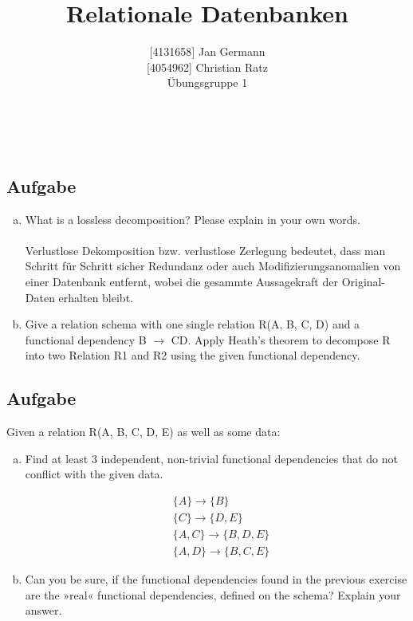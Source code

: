 \documentclass[11pt,a4paper,DIV=9]{scrartcl}
\author{{[}4131658{]} Jan Germann \\{[}4054962{]} Christian Ratz\\Übungsgruppe 1}
\title{Relationale Datenbanken}
\newcounter{temp}
\newcommand{\aufgabe}[1]{
  \setcounter{temp}{\value{subsection}}
  \setcounter{subsection}{#1}
  \addtocounter{subsection}{-1}
  \subsection{Aufgabe}
  \setcounter{subsection}{\value{temp}}
}
\renewcommand{\author}[1]{\renewcommand{\author}{#1}}
\renewcommand{\title}[1]{\renewcommand{\title}{#1}}
\newcommand{\makehomeworktitle}{
  \begin{minipage}[t]{6.5cm}
    \sf{\author}
  \end{minipage}
  \begin{minipage}[t]{6.5cm}
    \begin{flushright}
      \sf{\title\\\today}
    \end{flushright}
  \end{minipage}
  \\[0.2cm]
  \begin{center}
    \sf{
      \color{blue}{
        \LARGE{Aufgabenblatt \blattnr}
      }
    }
  \end{center}
  \vspace{0.1cm}
}
\begin{document}
\makehomeworktitle
\aufgabe{1}
  \begin{enumerate}[a.]
    \item What is a lossless decomposition? Please explain in your own words. \\\\
    Verlustlose Dekomposition bzw. verlustlose Zerlegung bedeutet, dass man Schritt f\"ur Schritt sicher Redundanz oder auch Modifizierungsanomalien von einer Datenbank entfernt, wobei die gesammte Aussagekraft der Original-Daten erhalten bleibt.
    \item Give a relation schema with one single relation R(A, B, C, D) and a functional dependency B $  \rightarrow $  CD. Apply Heath's theorem to decompose R into two Relation R1 and R2 using the given functional dependency.
  \end{enumerate}

\aufgabe{2}
  Given a relation R(A, B, C, D, E) as well as some data:
  \begin{enumerate}[a.]
    \item Find at least 3 independent, non-trivial functional dependencies that do not conflict with the given data.

    \begin{align}
      &\{A\}       \rightarrow \{B\}\\
      &\{C\}       \rightarrow \{D,E\}\\
      &\{A, C\}    \rightarrow \{B,D,E\}\\ 
      &\{A, D\}    \rightarrow \{B,C,E\}
    \end{align}

   \item Can you be sure, if the functional dependencies found in the previous exercise are the »real« functional dependencies, defined on the schema? Explain your answer.
  \end{enumerate}
\end{document}
